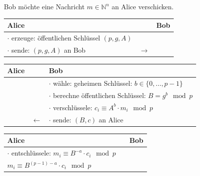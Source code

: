 \documentclass[utf8]{beamer}
\newcommand{\N}{\mathbb{N}}
\begin{document}
\begin{frame}{\insertsubsectionhead}
  Bob möchte eine Nachricht $m \in \N^n$ an Alice verschicken.

  \pause

  \begin{center}
    \begin{tabularx}{\textwidth}{Xcl}
      \textbf{Alice} & & \textbf{Bob}\\\midrule
      $\cdot$ erzeuge: öffentlichen Schlüssel $(p, g, A)$\\
      $\cdot$ sende: $(p, g, A)$ an Bob & $\to$
    \end{tabularx}
  \end{center}

  \pause

  \begin{center}
    \begin{tabularx}{\textwidth}{lcX}
      \textbf{Alice} &  & \textbf{Bob}\\\midrule
      & & $\cdot$ wähle: geheimen Schlüssel: $b\in \{ 0 ,\ldots , p - 1 \}$\\
      & & $\cdot$ berechne öffentlichen Schlüssel: $B = g^b \mod p$\\
      & & $\cdot$ verschlüssele: $c_i \equiv A^b \cdot m_i \mod p$\\
      & $\leftarrow$ & $\cdot$ sende: $(B, c)$ an Alice
    \end{tabularx}
  \end{center}

  \pause

  \begin{center}
    \begin{tabularx}{\textwidth}{Xcl}
      \textbf{Alice} &  & \textbf{Bob}\\\midrule
      $\cdot$ entschlüssele: $m_i \equiv B^{-a} \cdot c_i \mod p$\\
      $m_i \equiv B^{(p-1)-a} \cdot c_i \mod p$
    \end{tabularx}
  \end{center}
\end{frame}
\end{document}
